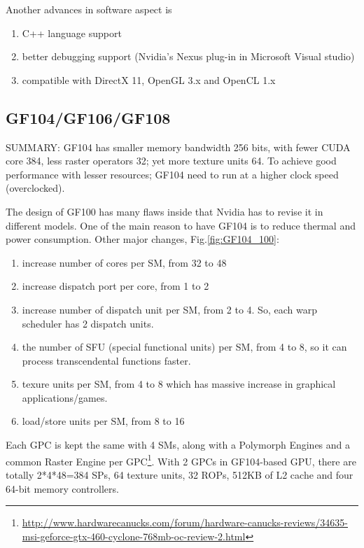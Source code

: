 Another advances in software aspect is
\begin{enumerate}
\item C++ language support
\item better debugging support (Nvidia's Nexus plug-in in Microsoft
  Visual studio)
\item compatible with DirectX 11, OpenGL 3.x and OpenCL 1.x 
\end{enumerate}



\subsection{GF104/GF106/GF108}
\label{sec:GF104_GF106_GF108}

SUMMARY: GF104 has smaller memory bandwidth
      256 bits, with fewer CUDA core 384, less raster operators 32; yet more
      texture units 64. To achieve good performance with lesser resources; GF104
      need to run at a higher clock speed (overclocked).
      
The design of GF100 has many flaws inside that Nvidia has to revise it in
different models. One of the main reason to have GF104 is to reduce thermal and
power consumption. Other major changes, Fig.\ref{fig:GF104_100}:
\begin{enumerate}
  \item increase number of cores per SM, from 32 to 48
  \item increase dispatch port per core, from 1 to 2
  \item increase number of dispatch unit per SM, from 2 to 4. So, each warp
  scheduler has 2 dispatch units. 
  \item the number of SFU (special functional units) per SM, from 4 to 8, so it
  can process transcendental functions faster.
  \item texure units per SM, from 4 to 8 which has massive increase in graphical
  applications/games. 
  \item load/store units per SM, from 8 to 16
\end{enumerate}
Each GPC is kept the same with 4 SMs, along with a Polymorph Engines and a
common Raster Engine per
GPC\footnote{\url{http://www.hardwarecanucks.com/forum/hardware-canucks-reviews/34635-msi-geforce-gtx-460-cyclone-768mb-oc-review-2.html}}.
With 2 GPCs in GF104-based GPU, there are totally 2*4*48=384 SPs, 64 texture
units, 32 ROPs, 512KB of L2 cache and four 64-bit memory controllers.

